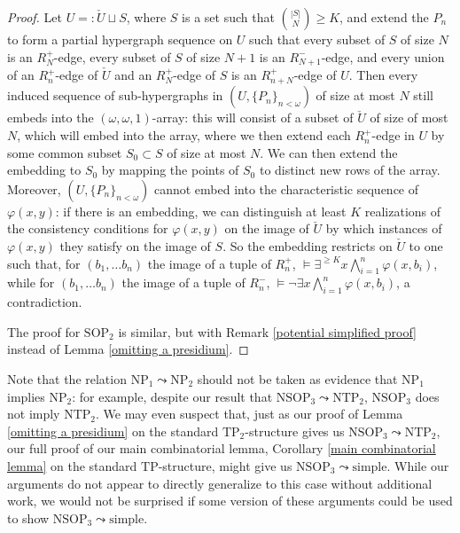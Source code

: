 \documentclass{amsart}
\theoremstyle{definition}
\theoremstyle{remark}
\numberwithin{equation}{section}
\begin{document}
\begin{tcolorbox}
\begin{proof}
   \: Let $U =: \check{U} \sqcup S$, where $S$ is a set such that ${|S|\choose N} \geq K$, and extend the $P_{n}$ to form a partial hypergraph sequence on $U$ such that every subset of $S$ of size $N$ is an $R^{+}_{N}$-edge, every subset of $S$ of size $N+1$ is an $R^{-}_{N+1}$-edge, and every union of an $R^{+}_{n}$-edge of $\check{U}$ and an $R^{+}_{N}$-edge of $S$ is an $R^{+}_{n+N}$-edge of $U$.  Then every induced sequence of sub-hypergraphs in  $( U, \{P_{n}\}_{n < \omega})$ of size at most $N$ still embeds into the $(\omega, \omega, 1)$-array: this will consist of a subset of $\check{U}$ of size of most $N$, which will embed into the array, where we then extend each $R^{+}_{n}$-edge in $U$ by some common subset $S_{0}  \subset S$ of size at most $N$. We can then extend the embedding to $S_{0}$ by mapping the points of $S_{0}$ to distinct new rows of the array. Moreover, $( U, \{P_{n}\}_{n < \omega})$ cannot embed into the characteristic sequence of $\varphi(x, y)$: if there is an embedding, we can distinguish at least $K$ realizations of the consistency conditions for $\varphi(x, y)$ on the image of $\check{U}$ by which instances of $\varphi(x, y)$ they satisfy on the image of $S$. So the embedding restricts on $\check{U}$ to one such that, for $(b_{1}, \ldots b_{n})$ the image of a tuple of $R^{+}_{n}$, $\models \exists^{\geq K} x \bigwedge^{n}_{i = 1} \varphi(x,b_{i})$, while for $(b_{1}, \ldots b_{n})$ the image of a tuple of $R^{-}_{n}$, $\models \neg \exists x \bigwedge^{n}_{i = 1} \varphi(x,b_{i})$, a contradiction.

  \:  The proof for $\mathrm{SOP}_{2}$ is similar, but with Remark \ref{potential simplified proof} instead of Lemma \ref{omitting a presidium}.
\end{proof}


\: Note that the relation $\mathrm{NP}_{1}\leadsto \mathrm{NP}_{2}$ should not be taken as evidence that $\mathrm{NP}_{1}$ implies $\mathrm{NP}_{2}$: for example, despite our result that $\mathrm{NSOP}_{3} \leadsto \mathrm{NTP}_{2}$, $\mathrm{NSOP}_{3}$ does not imply $\mathrm{NTP}_{2}$. We may even suspect that, just as our proof of Lemma \ref{omitting a presidium} on the standard $\mathrm{TP}_{2}$-structure gives us $\mathrm{NSOP}_{3} \leadsto \mathrm{NTP}_{2}$, our full proof of our main combinatorial lemma, Corollary \ref{main combinatorial lemma} on the standard $\mathrm{TP}$-structure, might give us $\mathrm{NSOP}_{3} \leadsto \mathrm{simple}$. While our arguments do not appear to directly generalize to this case without additional work, we would not be surprised if some version of these arguments could be used to show $\mathrm{NSOP}_{3} \leadsto \mathrm{simple}$.


\end{tcolorbox}
\end{document}
